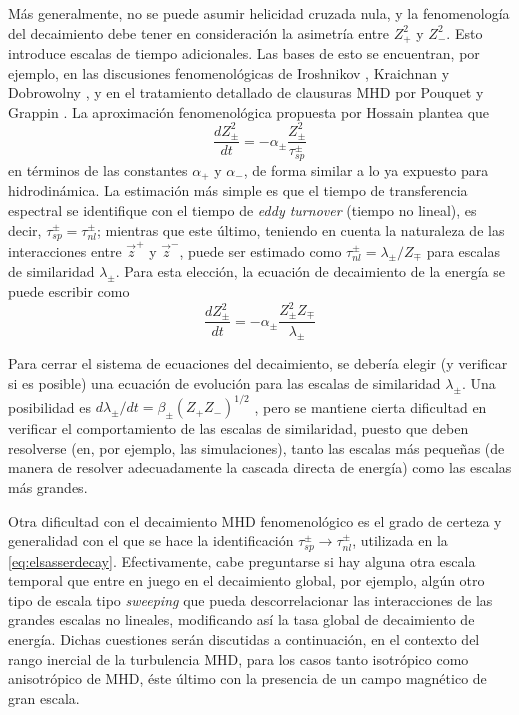 Más generalmente, no se puede asumir helicidad cruzada nula, y la
fenomenología del decaimiento debe tener en consideración la asimetría
entre $Z_+^2$ y $Z_-^2$. Esto introduce escalas de tiempo
adicionales. Las bases de esto se encuentran, por ejemplo, en las
discusiones fenomenológicas de Iroshnikov
\cite{iroshnikov_turbulence_1964}, Kraichnan
\cite{kraichnan_inertial-range_1965} y Dobrowolny
\cite{dobrowolny_fully_1980}, y en el tratamiento detallado de
clausuras MHD por Pouquet \cite{pouquet_strong_1976} y Grappin
\cite{grappin_dependence_1983}. La aproximación fenomenológica
propuesta por Hossain \cite{hossain_phenomenology_1995} plantea que
\begin{equation}
  \frac{dZ_\pm^2}{dt} = -\alpha_\pm \frac{Z_\pm^2}{\tau_{sp}^\pm}
\end{equation}
en términos de las constantes $\alpha_+$ y $\alpha_-$, de forma
similar a lo ya expuesto para hidrodinámica. La estimación más simple
\cite{pouquet_strong_1976, grappin_dependence_1983} es que el tiempo
de transferencia espectral se identifique con el tiempo de
\textit{eddy turnover} (tiempo no lineal), es decir, $\tau_{sp}^\pm =
\tau_{nl}^\pm$; mientras que este último, teniendo en cuenta la
naturaleza de las interacciones entre $\vec{z}^+$ y $\vec{z}^-$, puede
ser estimado como $\tau_{nl}^\pm = \lambda_\pm / Z_\mp$ para escalas
de similaridad $\lambda_\pm$. Para esta elección, la ecuación de
decaimiento de la energía se puede escribir como
\begin{equation}\label{eq:elsasserdecay}
  \frac{dZ_\pm^2}{dt} = -\alpha_\pm \frac{Z_\pm^2 Z_\mp}{\lambda_\pm}
\end{equation}

Para cerrar el sistema de ecuaciones del decaimiento, se debería
elegir (y verificar si es posible) una ecuación de evolución para las
escalas de similaridad $\lambda_\pm$. Una posibilidad es
$d\lambda_\pm/dt = \beta_\pm (Z_+Z_-)^{1/2}$
\cite{hossain_phenomenology_1995}, pero se mantiene cierta dificultad
en verificar el comportamiento de las escalas de similaridad, puesto
que deben resolverse (en, por ejemplo, las simulaciones), tanto las
escalas más pequeñas (de manera de resolver adecuadamente la cascada
directa de energía) como las escalas más grandes.

Otra dificultad con el decaimiento MHD fenomenológico es el grado de
certeza y generalidad con el que se hace la identificación
$\tau_{sp}^\pm \rightarrow \tau_{nl}^\pm$, utilizada en la
\cref{eq:elsasserdecay}. Efectivamente, cabe preguntarse si hay alguna
otra escala temporal que entre en juego en el decaimiento global, por
ejemplo, algún otro tipo de escala tipo \textit{sweeping} que pueda
descorrelacionar las interacciones de las grandes escalas no lineales,
modificando así la tasa global de decaimiento de energía. Dichas
cuestiones serán discutidas a continuación, en el contexto del rango
inercial de la turbulencia MHD, para los casos tanto isotrópico como
anisotrópico de MHD, éste último con la presencia de un campo
magnético de gran escala.

